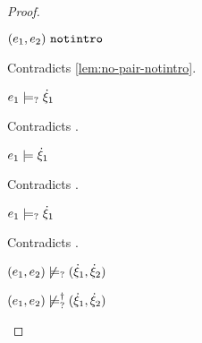 \begin{proof}
\begin{byCases}
\begin{byCases}
\begin{byCases}
\begin{byCases}
                \begin{pfsteps*}
                \item $(e_1 , e_2) ~\mathtt{notintro}$ 
                \end{pfsteps*}
                Contradicts \autoref{lem:no-pair-notintro}.
            \item[\text{(\ref{rule:CMSPair1})}]
                \begin{pfsteps*}
                \item $e_1 \models_{?} \dot{\xi}_1$ 
                \end{pfsteps*}
                Contradicts .
            \item[\text{(\ref{rule:CMSPair2})}]
                \begin{pfsteps*}
                \item $e_1 \models \dot{\xi}_1$ 
                \end{pfsteps*}
                Contradicts .
            \item[\text{(\ref{rule:CMSPair3})}]
                \begin{pfsteps*}
                \item $e_1 \models_{?} \dot{\xi}_1$ 
                \end{pfsteps*}
                Contradicts .
            \end{byCases}
            \begin{pfsteps*}
            \item $(e_1 , e_2) \not\models_{?} (\dot{\xi}_1 , \dot{\xi}_2)$  
            \item $(e_1 , e_2) \not\models_{?}^{\dag} (\dot{\xi}_1 , \dot{\xi}_2)$ 
            \end{pfsteps*}
            

\end{byCases}
\end{byCases}
\end{byCases}
\end{proof}
